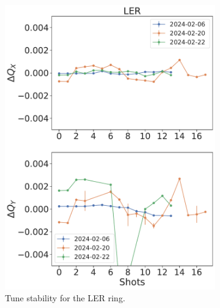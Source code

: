 \begin{figure}[!htb]
    \centering
    \begin{subfigure}[b]{0.48\textwidth}
        \includegraphics[width=\linewidth]{images/kek/SUPERKEKBLER_shots.pdf}
        \caption{Tune stability for the LER ring.}
    \end{subfigure}
    \hfill
    \begin{subfigure}[b]{0.48\textwidth}

\end{subfigure}
\end{figure}
